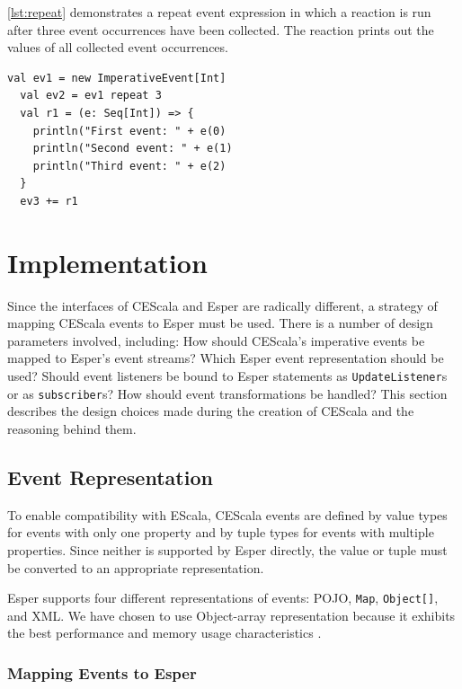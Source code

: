 \documentclass[book,type=bsc,colorback,accentcolor=tud8b,12pt,twoside]{tudthesis}
\begin{document}
\autoref{lst:repeat} demonstrates a repeat event expression in which a reaction is run after three event occurrences have been collected.  The reaction prints out the values of all collected event occurrences.  

\begin{lstlisting}[caption=A repeat event expression,label=lst:repeat,float=tp]
  val ev1 = new ImperativeEvent[Int]
  val ev2 = ev1 repeat 3
  val r1 = (e: Seq[Int]) => {
    println("First event: " + e(0)
    println("Second event: " + e(1)
    println("Third event: " + e(2)
  }
  ev3 += r1
\end{lstlisting}

\chapter{Implementation}
\label{sec:implementation}

Since the interfaces of CEScala and Esper are radically different, a strategy of mapping CEScala events to Esper must be used.  There is a number of design parameters involved, including: How should CEScala's imperative events be mapped to Esper's event streams?  Which Esper event representation should be used?  Should event listeners be bound to Esper statements as \mbox{\texttt{UpdateListener}}s or as \mbox{\texttt{subscriber}}s?  How should event transformations be handled?  This section describes the design choices made during the creation of CEScala and the reasoning behind them.  

\section{Event Representation}
\label{sec:event-representation}

To enable compatibility with EScala, CEScala events are defined by value types for events with only one property and by tuple types for events with multiple properties.  Since neither is supported by Esper directly, the value or tuple must be converted to an appropriate representation.  

Esper supports four different representations of events: \mbox{POJO}, \mbox{\texttt{Map}}, \mbox{\texttt{Object[]}}, and \mbox{XML}.  We have chosen to use Object-array representation because it exhibits the best performance and memory usage characteristics \cite{Esper}.  

\subsection{Mapping Events to Esper}
\label{sec:mapping-events-esper}
\end{document}
